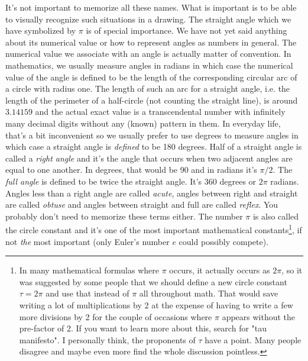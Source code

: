 It's not important to memorize all these names. What is important is to be able to visually recognize such situations in a drawing. The straight angle which we have symbolized by $\pi$ is of special importance. We have not yet said anything about its numerical value or how to represent angles as numbers in general. The numerical value we associate with an angle is actually matter of convention. In mathematics, we usually measure angles in radians in which case the numerical value of the angle is defined to be the length of the corresponding circular arc of a circle with radius one. The length of such an arc for a straight angle, i.e. the length of the perimeter of a half-circle (not counting the straight line), is around $3.14159$ and the actual exact value is a transcendental number with infinitely many decimal digits without any (known) pattern in them. In everyday life, that's a bit inconvenient so we usually prefer to use degrees to measure angles in which case a straight angle is \emph{defined} to be 180 degrees. Half of a straight angle is called a \emph{right angle} and it's the angle that occurs when two adjacent angles are equal to one another. In degrees, that would be 90 and in radians it's $\pi / 2$. The \emph{full angle} is defined to be twice the straight angle. It's 360 degrees or $2 \pi$ radians. Angles less than a right angle are called \emph{acute}, angles between right and straight are called \emph{obtuse} and angles between straight and full are called \emph{reflex}. You probably don't need to memorize these terms either. The number $\pi$ is also called the circle constant and it's one of the most important mathematical constants\footnote{In many mathematical formulas where $\pi$ occurs, it actually occurs as $2 \pi$, so it was suggested by some people that we should define a new circle constant $\tau = 2 \pi$ and use that instead of $\pi$ all throughout math. That would save writing a lot of multiplications by 2 at the expense of having to write a few more divisions by 2 for the couple of occasions where $\pi$ appears without the pre-factor of 2. If you want to learn more about this, search for "tau manifesto". I personally think, the proponents of $\tau$ have a point. Many people disagree and maybe even more find the whole discussion pointless.}, if not \emph{the} most important (only Euler's number $e$ could possibly compete).


